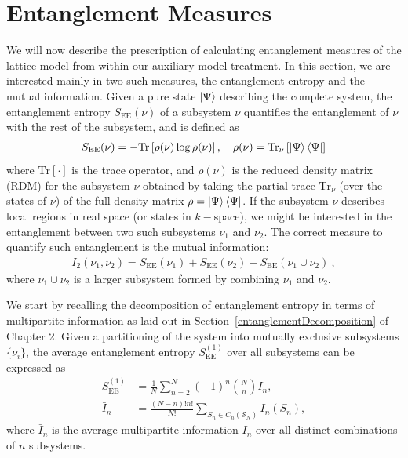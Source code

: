 \section{Entanglement Measures}
We will now describe the prescription of calculating entanglement measures of the lattice model from within our auxiliary model treatment. In this section, we are interested mainly in two such measures, the entanglement entropy and the mutual information. Given a pure state \(\ket{\Psi}\) describing the complete system, the entanglement entropy \(S_\text{EE}(\nu)\) of a subsystem \(\nu\) quantifies the entanglement of \(\nu\) with the rest of the subsystem, and is defined as
\begin{equation}\begin{aligned}
	S_\text{EE}(\nu) = -\text{Tr}\left[\rho(\nu)\log \rho(\nu)\right],\quad \rho(\nu) = \text{Tr}_\nu\left[\ket{\Psi}\bra{\Psi}\right] 
\end{aligned}\end{equation}
where \(\text{Tr}\left[\cdot\right] \) is the trace operator, and \(\rho(\nu)\) is the reduced density matrix (RDM) for the subsystem \(\nu\) obtained by taking the partial trace \(\text{Tr}_\nu\) (over the states of \(\nu\)) of the full density matrix \(\rho = \ket{\Psi}\bra{\Psi}\). If the subsystem \(\nu\) describes local regions in real space (or states in \(k-\)space), we might be interested in the entanglement between two such subsystems \(\nu_1\) and \(\nu_2\). The correct measure to quantify such entanglement is the mutual information:
\begin{equation}\begin{aligned}
	I_2(\nu_1,\nu_2) = S_\text{EE}(\nu_1) + S_\text{EE}(\nu_2) - S_\text{EE}(\nu_1 \cup \nu_2)~,
\end{aligned}\end{equation}
where \(\nu_1 \cup \nu_2\) is a larger subsystem formed by combining \(\nu_1\) and \(\nu_2\).

We start by recalling the decomposition of entanglement entropy in terms of multipartite information as laid out in Section~\ref{entanglementDecomposition} of Chapter 2. Given a partitioning of the system into mutually exclusive subsystems \(\{\nu_i\}\), the average entanglement entropy \(S_\text{EE}^{(1)}\) over all subsystems can be expressed as
\begin{equation}\begin{aligned}
	S_\text{EE}^{(1)} &= \frac{1}{N}\sum_{n=2}^N (-1)^{n} \binom{N}{n} \bar I_n,\\
	\bar I_n &= \frac{(N-n)! n!}{N!}\sum_{S_n \in C_n(\mathcal{S}_N)} I_n(S_n),
\end{aligned}\end{equation}
where \(\bar I_n\) is the  average multipartite information \(I_n\) over all distinct combinations of \(n\) subsystems.

